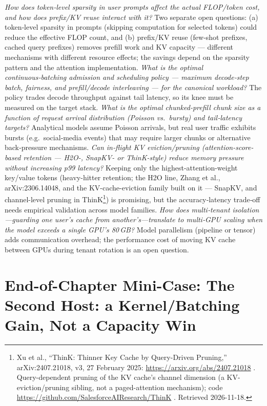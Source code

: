 \emph{How does token‑level sparsity in user prompts affect the actual
FLOP/token cost, and how does prefix/KV reuse interact with it?} Two
separate open questions: (a) token‑level sparsity in prompts (skipping
computation for selected tokens) could reduce the effective FLOP count,
and (b) prefix/KV reuse (few‑shot prefixes, cached query prefixes)
removes prefill work and KV capacity --- different mechanisms with
different resource effects; the savings depend on the sparsity pattern
and the attention implementation. \emph{What is the optimal
continuous‑batching admission and scheduling policy --- maximum
decode‑step batch, fairness, and prefill/decode interleaving --- for the
canonical workload?} The policy trades decode throughput against tail
latency, so its knee must be measured on the target stack. \emph{What is
the optimal chunked‑prefill chunk size as a function of request arrival
distribution (Poisson vs.~bursty) and tail‑latency targets?} Analytical
models assume Poisson arrivals, but real user traffic exhibits bursts
(e.g.~social‑media events) that may require larger chunks or alternative
back‑pressure mechanisms. \emph{Can in‑flight KV eviction/pruning
(attention-score-based retention --- H2O-, SnapKV- or ThinK-style)
reduce memory pressure without increasing p99 latency?} Keeping only the
highest-attention-weight key/value tokens (heavy-hitter retention; the
H2O line, Zhang et al., arXiv:2306.14048, and the KV-cache-eviction
family built on it --- SnapKV, and channel-level pruning in
ThinK\footnote{Xu et al., ``ThinK: Thinner Key Cache by Query-Driven
  Pruning,'' arXiv:2407.21018, v3, 27 February 2025:
  \url{https://arxiv.org/abs/2407.21018} . Query-dependent pruning of the KV
  cache's channel dimension (a KV-eviction/pruning sibling, not a
  paged-attention mechanism); code
  \url{https://github.com/SalesforceAIResearch/ThinK} . Retrieved 2026-11-18.})
is promising, but the accuracy‑latency trade‑off needs empirical
validation across model families. \emph{How does multi‑tenant
isolation---guarding one user's cache from another's---translate to
multi‑GPU scaling when the model exceeds a single GPU's 80\,GB?} Model
parallelism (pipeline or tensor) adds communication overhead; the
performance cost of moving KV cache between GPUs during tenant rotation
is an open question.

\section{End-of-Chapter Mini-Case: The Second Host: a Kernel/Batching
Gain, Not a Capacity
Win}\label{end-of-chapter-mini-case-the-second-host-a-kernelbatching-gain-not-a-capacity-win}

